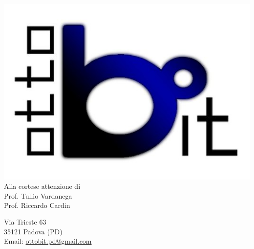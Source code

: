 \documentclass[11pt,a4paper]{article}
\begin{document}
	\noindent\begin{minipage}{0.3\textwidth}
	\includegraphics[scale=0.3]{images/logo.png}\\
		Alla cortese attenzione di\\
		Prof. Tullio Vardanega\\
		Prof. Riccardo Cardin
	\end{minipage}
	\hfill
	\begin{minipage}{0.3\textwidth}\raggedleft
		Via Trieste 63\\
		35121 Padova (PD)\\
		Email:  \href{mailto:ottobit.pd@gmail.com}{ottobit.pd@gmail.com}
	\end{minipage}


\vspace{4em}%
\end{document}
